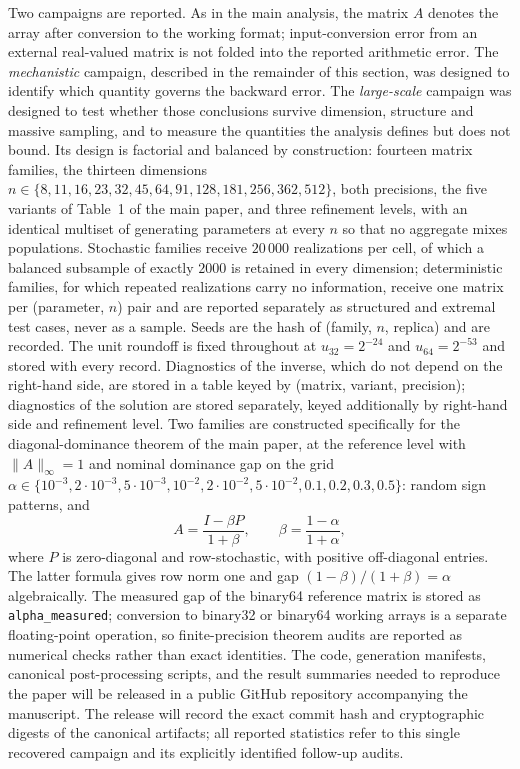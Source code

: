 \documentclass[supplement,review,onefignum,onetabnum]{siamart251216}
\begin{document}
Two campaigns are reported. As in the main analysis, the matrix $A$ denotes the array after
conversion to the working format; input-conversion error from an external real-valued matrix is not
folded into the reported arithmetic error. The \emph{mechanistic} campaign, described in the
remainder of this section, was designed to identify which quantity governs the backward error. The
\emph{large-scale} campaign was designed to test whether those conclusions survive dimension,
structure and massive sampling, and to measure the quantities the analysis defines but does not
bound. Its design is factorial and balanced by construction: fourteen matrix families, the
thirteen dimensions $n\in\{8,11,16,23,32,45,64,91,128,181,256,362,512\}$, both precisions, the
five variants of Table~1 of the main paper, and three refinement levels, with an identical
multiset of generating parameters at every $n$ so that no aggregate mixes populations. Stochastic
families receive $20\,000$ realizations per cell, of which a balanced subsample of exactly $2000$
is retained in every dimension; deterministic families, for which repeated realizations carry no
information, receive one matrix per (parameter, $n$) pair and are reported separately as
structured and extremal test cases, never as a sample. Seeds are the hash of
(family, $n$, replica) and are recorded. The unit roundoff is fixed throughout at $u_{32}=2^{-24}$
and $u_{64}=2^{-53}$ and stored with every record. Diagnostics of the inverse, which do not
depend on the right-hand side, are stored in a table keyed by (matrix, variant, precision);
diagnostics of the solution are stored separately, keyed additionally by right-hand side and
refinement level. Two families are constructed specifically for the diagonal-dominance theorem of the main paper,
at the reference level with $\|A\|_\infty=1$ and nominal dominance gap on the grid
$\alpha\in\{10^{-3},2\!\cdot\!10^{-3},5\!\cdot\!10^{-3},10^{-2},2\!\cdot\!10^{-2},
5\!\cdot\!10^{-2},0.1,0.2,0.3,0.5\}$: random sign patterns, and
\[
A=\frac{I-\beta P}{1+\beta},\qquad \beta=\frac{1-\alpha}{1+\alpha},
\]
where $P$ is zero-diagonal and row-stochastic, with positive off-diagonal entries. The latter formula gives row norm one and
gap $(1-\beta)/(1+\beta)=\alpha$ algebraically. The measured gap of the binary64 reference matrix
is stored as \texttt{alpha\_measured}; conversion to binary32 or binary64 working arrays is a
separate floating-point operation, so finite-precision theorem audits are reported as numerical
checks rather than exact identities. The code, generation manifests, canonical post-processing scripts, and the result summaries needed
to reproduce the paper will be released in a public GitHub repository accompanying the manuscript.
The release will record the exact commit hash and cryptographic digests of the canonical artifacts;
all reported statistics refer to this single recovered campaign and its explicitly identified
follow-up audits.
\end{document}
